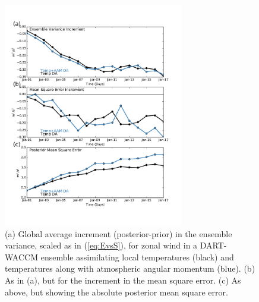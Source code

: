  \begin{figure}
	 \includegraphics[width=0.7\textwidth]{Paper_figures/ERPDA_paper_MSE_RST_vs_ERPRST_global.pdf}
	 \caption{(a) Global average increment (posterior-prior) in the ensemble variance, scaled as in (\ref{eq:EvsS}), for zonal wind in a DART-WACCM ensemble assimilating local temperatures (black) and temperatures along with atmospheric angular momentum (blue). (b) As in (a), but for the increment in the mean square error. (c) As above, but showing the absolute posterior mean square error.}
	 \label{fig:added_value_MSE}
\end{figure}

